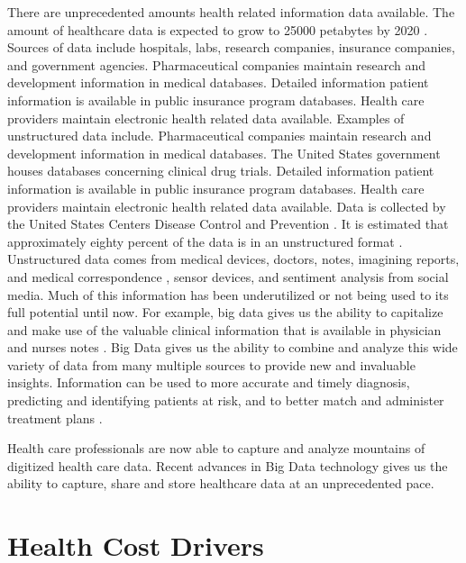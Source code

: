 \documentclass[sigconf]{acmart}
\begin{document}
There are unprecedented amounts health related information data available.  The amount of healthcare data is expected to grow to 25000 petabytes by 2020 \cite{www-google-rock}. Sources of data include hospitals, labs, research companies, insurance companies, and government agencies. Pharmaceutical companies maintain research and development information in medical databases. Detailed information patient information is available in public insurance program databases. Health care providers maintain electronic health related data available.  Examples of unstructured data include. Pharmaceutical companies maintain research and development information in medical databases. The United States government houses databases concerning clinical drug trials. Detailed information patient information is available in public insurance program databases. Health care providers maintain electronic health related data available. Data is collected by the United States Centers Disease Control and Prevention \cite{www-google-CIO}. It is estimated that approximately eighty percent of the data is in an unstructured format \cite{www-google-McDonald}.  Unstructured data comes from medical devices, doctors, notes, imagining reports, and medical correspondence \cite{www-google-McDonald}, sensor devices, and sentiment analysis from social media.  Much of this information has been underutilized or not being used to its full potential until now. For example, big data gives us the ability to capitalize and make use of the valuable clinical information that is available in physician and nurses notes \cite{www-google-HlthCat}.  Big Data gives us the ability to combine and analyze this wide variety of data from many multiple sources to provide new and invaluable insights. Information can be used to more accurate and timely diagnosis, predicting and identifying patients at risk, and to better match and administer treatment plans \cite{www-google-McDonald}. 

Health care professionals are now able to capture and analyze mountains of digitized health care data. Recent advances in Big Data technology gives us the ability to capture, share and store healthcare data at an unprecedented pace.

\section{Health Cost Drivers}
\end{document}
